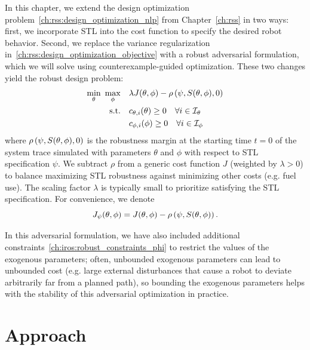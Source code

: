 In this chapter, we extend the design optimization problem~\eqref{ch:rss:design_optimization_nlp} from Chapter~\ref{ch:rss} in two ways: first, we incorporate STL into the cost function to specify the desired robot behavior. Second, we replace the variance regularization in~\eqref{ch:rss:design_optimization_objective} with a robust adversarial formulation, which we will solve using counterexample-guided optimization. These two changes yield the robust design problem:
%
\begin{subequations}\label{ch:iros:robust_nlp_generic}
    \begin{align}
        \min_\theta\ \max_\phi & \quad \lambda J(\theta, \phi) - \rho\left( \psi, S(\theta, \phi), 0 \right)  \label{ch:iros:robust_objective_generic}          \\
        \text{s.t.}            & \quad c_{\theta, i}(\theta) \geq 0 \quad \forall i \in \mathcal{I}_{\theta} \label{ch:iros:robust_constraints_theta} \\
                               & \quad c_{\phi, i}(\phi) \geq 0 \quad \forall i \in \mathcal{I}_{\phi} \label{ch:iros:robust_constraints_phi}
    \end{align}
\end{subequations}
%
where $\rho\left( \psi, S(\theta, \phi), 0 \right)$ is the robustness margin at the starting time $t=0$ of the system trace simulated with parameters $\theta$ and $\phi$ with respect to STL specification $\psi$. We subtract $\rho$ from a generic cost function $J$ (weighted by $\lambda > 0$) to balance maximizing STL robustness against minimizing other costs (e.g. fuel use). The scaling factor $\lambda$ is typically small to prioritize satisfying the STL specification. For convenience, we denote
\begin{equation}
    J_\psi(\theta, \phi) = J(\theta, \phi) - \rho\left( \psi, S(\theta, \phi) \right).
\end{equation}

In this adversarial formulation, we have also included additional constraints~\eqref{ch:iros:robust_constraints_phi} to restrict the values of the exogenous parameters; often, unbounded exogenous parameters can lead to unbounded cost (e.g. large external disturbances that cause a robot to deviate arbitrarily far from a planned path), so bounding the exogenous parameters helps with the stability of this adversarial optimization in practice.

\section{Approach}


